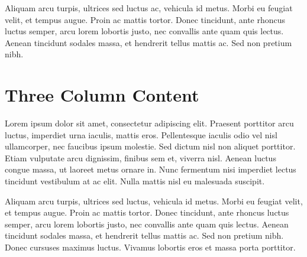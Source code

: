 \documentclass[a4paper]{CSMakotoTechnicalReport}
\begin{document}
Aliquam arcu turpis, ultrices sed luctus ac, vehicula id metus. Morbi eu feugiat velit, et tempus augue. Proin ac mattis tortor. Donec tincidunt, ante rhoncus luctus semper, arcu lorem lobortis justo, nec convallis ante quam quis lectus. Aenean tincidunt sodales massa, et hendrerit tellus mattis ac. Sed non pretium nibh.


\section{Three Column Content}

\begin{multicols}{3} %

    Lorem ipsum dolor sit amet, consectetur adipiscing elit. Praesent porttitor arcu luctus, imperdiet urna iaculis, mattis eros. Pellentesque iaculis odio vel nisl ullamcorper, nec faucibus ipsum molestie. Sed dictum nisl non aliquet porttitor. Etiam vulputate arcu dignissim, finibus sem et, viverra nisl. Aenean luctus congue massa, ut laoreet metus ornare in. Nunc fermentum nisi imperdiet lectus tincidunt vestibulum at ac elit. Nulla mattis nisl eu malesuada suscipit.

    Aliquam arcu turpis, ultrices sed luctus, vehicula id metus. Morbi eu feugiat velit, et tempus augue. Proin ac mattis tortor. Donec tincidunt, ante rhoncus luctus semper, arcu lorem lobortis justo, nec convallis ante quam quis lectus. Aenean tincidunt sodales massa, et hendrerit tellus mattis ac. Sed non pretium nibh. Donec cursuses maximus luctus. Vivamus lobortis eros et massa porta porttitor.

\end{multicols} %


\newpage

\begin{multicols}{2} %


    \printbibliography[title=Reference List] %

\end{multicols} %
\end{document}
